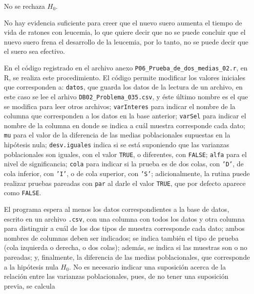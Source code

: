\begin{solucion}
 \begin{decision}
  No se rechaza $H_0$.
 \end{decision}

 \begin{conclusion}
  No hay evidencia suficiente para creer
  que el nuevo suero aumenta el tiempo de vida de ratones con leucemia,
  lo que quiere decir que no se puede concluir
  que el nuevo suero frena el desarrollo de la leucemia,
  por lo tanto, no se puede decir que el suero sea efectivo.
 \end{conclusion}

 En el c\'odigo registrado en el archivo anexo
 \texttt{P06\_Prueba\_de\_dos\_medias\_02.r}, en R,
 se realiza este procedimiento.
 El c\'odigo permite modificar los valores iniciales
 que corresponden a:
 \texttt{datos}, que guarda los datos de la lectura
 de un archivo,
 en este caso se lee el arhivo \texttt{DB02\_Problema\_035.csv},
 y \'este \'ultimo nombre es el que se modifica 
 para leer otros archivos;
 \texttt{varInteres} para indicar el nombre de la columna
 que corresponden a los datos en la base anterior;
 \texttt{varSel} para indicar el nombre de la columna
 en donde se indica a cu\'al muestra corresponde cada dato;
 \texttt{mu} para el valor de la diferencia de las medias
 poblacionales supuestas en la hip\'otesis nula;
 \texttt{desv.iguales} indica si se est\'a suponiendo
 que las varianzas poblacionales son iguales,
 con el valor \texttt{TRUE}, o diferentes, con \texttt{FALSE};
 \texttt{alfa} para el nivel de significancia;
 \texttt{cola} para indicar si la prueba es de dos colas,
 con \texttt{'D'}, de cola inferior, con \texttt{'I'},
 o de cola superior, con \texttt{'S'};
 adicionalmente, la rutina puede realizar pruebas pareadas
 con \texttt{par} al darle el valor \texttt{TRUE},
 que por defecto aparece como \texttt{FALSE}.
 \par 
 El programa espera al menos los datos correspondientes
 a la base de datos, escrito en un archivo \texttt{.csv},
 con una columna con todos los datos y otra columna
 para distinguir a cu\'al de los dos tipos de muestra corresponde cada dato; ambos nombres de columnas deben ser indicados;
 se indica tambi\'en el tipo de prueba (cola izquierda o derecha,
 o dos colas);
 adem\'as, se indica si las muestras son o no pareadas;
 y, finalmente, la diferencia de las medias poblacionales,
 que corresponde a la hip\'otesis nula $H_0$.
 No es necesario indicar una suposici\'on acerca de la relaci\'on
 entre las varianzas poblacionales,
 pues, de no tener una suposici\'on previa, se calcula

\end{solucion}
